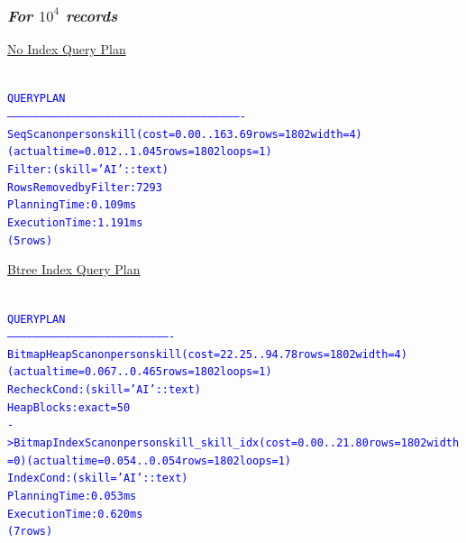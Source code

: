 \documentclass{article}
\begin{document}
    \subsubsection*{\emph{For $10^4$ records}}
    \underline{No Index Query Plan}
    \begin{center}
      {\tiny
      \begin{alltt}
      \textcolor{blue}{
        QUERY PLAN                                                  
        -------------------------------------------------------------------------------------------------------------
         Seq Scan on personskill  (cost=0.00..163.69 rows=1802 width=4) (actual time=0.012..1.045 rows=1802 loops=1)
           Filter: (skill = 'AI'::text)
           Rows Removed by Filter: 7293
         Planning Time: 0.109 ms
         Execution Time: 1.191 ms
        (5 rows)
       }
      \end{alltt}
      }
      \end{center}
    \underline{Btree Index Query Plan}
    \begin{center}
      {\tiny
      \begin{alltt}
      \textcolor{blue}{
        QUERY PLAN                                                              
        ----------------------------------------------------------------------------
         Bitmap Heap Scan on personskill  (cost=22.25..94.78 rows=1802 width=4)  (actual time=0.067..0.465 rows=1802 loops=1)
           Recheck Cond: (skill = 'AI'::text)
           Heap Blocks: exact=50
           ->  Bitmap Index Scan on personskill_skill_idx  (cost=0.00..21.80 rows=1802 width=0) (actual time=0.054..0.054 rows=1802 loops=1)
                 Index Cond: (skill = 'AI'::text)
         Planning Time: 0.053 ms
         Execution Time: 0.620 ms
        (7 rows)
       }
      \end{alltt}
      }
      \end{center}
\end{document}
